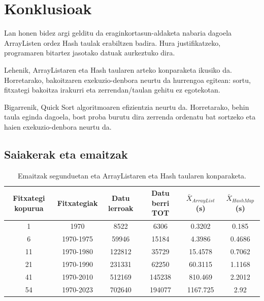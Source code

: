 \documentclass[a4paper,10pt]{report}
\begin{document}
\chapter{Konklusioak}
Lan honen bidez argi gelditu da eraginkortasun-aldaketa nabaria dagoela ArrayListen ordez Hash taulak erabiltzen badira. Hura justifikatzeko, programaren bitartez jasotako datuak aurkeztuko dira.

Lehenik, ArrayListaren eta Hash taularen arteko konparaketa ikusiko da. Horretarako, bakoitzaren exekuzio-denbora neurtu da hurrengoa egitean: sortu, fitxategi bakoitza irakurri eta zerrendan/taulan gehitu ez egotekotan.

Bigarrenik, Quick Sort algoritmoaren efizientzia neurtu da. Horretarako, behin taula eginda dagoela, bost proba burutu dira zerrenda ordenatu bat sortzeko eta haien exekuzio-denbora neurtu da.

\section{Saiakerak eta emaitzak}
\begin{table}[h!]
\begin{scriptsize}
\begin{center}
\begin{tabular}{|c|c|c|c|c|c|}
\hline 
	\textbf{Fitxategi kopurua} & \textbf{Fitxategiak} & \textbf{Datu lerroak} & \textbf{Datu berri TOT} & $\bar{X}_{ArrayList}$ (s) & $\bar{X}_{HashMap}$ (s) \\
\hline
	1 & 1970 & 8522 & 6306 & 0.3202  & 0.185 \\
\hline
	6 & 1970-1975 & 59946 & 15184 & 4.3986 & 0.4686 \\
\hline
	11 & 1970-1980 & 122812 & 35729 & 15.4578 & 0.7062 \\
\hline
	21 & 1970-1990 & 231331 & 62250 & 60.3115 & 1.1168 \\
\hline
	41 & 1970-2010 & 512169 & 145238 & 810.469 & 2.2012 \\
\hline
	54 & 1970-2023 & 702640 & 194077 & 1167.725 & 2.92 \\
\hline
\end{tabular}\end{center}\end{scriptsize}
\caption{\label{tab3} Emaitzak segunduetan eta ArrayListaren eta Hash taularen konparaketa.
}
\end{table}
\end{document}
